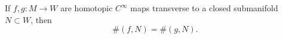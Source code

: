 If $f, g \colon M \to W$ are homotopic $C^{\infty}$ maps transverse to a closed submanifold $N \subset W$, then
$$
\#(f, N) = \#(g, N).
$$

